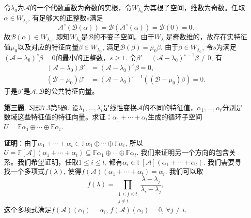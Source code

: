 {令$\lambda_0$为$\mathscr{A}$的一个代数重数为奇数的实根，令$W_{\lambda_0}$为其根子空间，维数为奇数。任取$\alpha \in W_{\lambda_0}$, 有足够大的正整数$s$满足
$$\mathscr{A}^s(\mathscr{B}(\alpha)) = \mathscr{B} (\mathscr{A}^s(\alpha)) = \mathscr{B}(0) = 0.$$
故$\mathscr{B}(\alpha) \in W_{\lambda_0}$, 即知$W_{\lambda_0}$是$\mathscr{B}$的不变子空间。由于$W_{\lambda_0}$是奇数维的，故存在实特征值$\mu_0$以及对应的特征向量$\beta \in W_{\lambda_0}$, 满足$\mathscr{B}(\beta) = \mu_0 \beta$. 由于$\beta \in W_{\lambda_0}$, 令$s$为满足
$(\mathscr{A} - \lambda_0)^s \beta = 0$的最小的正整数，$s \geqslant 1$. 令$\beta' = (\mathscr{A} - \lambda_0)^{s-1} \beta \neq 0$, 有
\begin{align*}
(\mathscr{A} - \lambda_0) \beta' & = (\mathscr{A} - \lambda_0)^s \beta = 0, \\
(\mathscr{B} - \mu_0) \beta' & = (\mathscr{A} - \lambda_0)^{s-1} ((\mathscr{B} - \mu_0) \beta) = 0.
\end{align*}
于是$\beta'$是$\mathscr{A,B}$的公共特征向量。







\newpageorvspace


{\bf 第三题}. 习题7.3第5题. 设$\lambda_1, \ldots, \lambda_t$是线性变换$\mathscr{A}$的不同的特征值，$\alpha_1, \ldots, \alpha_t$分别是数域这些特征值的特征向量。求证：$\alpha_1 + \cdots + \alpha_t$生成的循环子空间$U = \mathbb{F}\alpha_1 \oplus \cdots \oplus \mathbb{F}\alpha_t$.

\newpageorvspace

{\bf 证明}：由于$\alpha_1 + \cdots + \alpha_t \in \mathbb{F}\alpha_1 \oplus \cdots \oplus \mathbb{F}\alpha_t$, 所以$U = \mathbb{F}[\mathscr{A}](\alpha_1 + \cdots + \alpha_t) \subseteq \mathbb{F}\alpha_1 \oplus \cdots \oplus \mathbb{F}\alpha_t$. 我们来证明另一个方向的包含关系。我们希望证明，任取$1 \leqslant i \leqslant t$, 都有$\alpha_i \in \mathbb{F}[\mathscr{A}](\alpha_1 + \cdots + \alpha_t)$. 我们需要寻找一个多项式$f(\lambda)$, 使得$f(\mathscr{A}) (\alpha_1 + \cdots + \alpha_t) = \alpha_i$. 我们可以取
$$f(\lambda) = \prod\limits_{\substack{1 \leqslant j \leqslant t \\ j \neq i}} \dfrac{\lambda - \lambda_j}{\lambda_i - \lambda_j},$$
这个多项式满足$f(\mathscr{A})(\alpha_i) = \alpha_i$, $f(\mathscr{A})(\alpha_i) = 0$, $\forall j \neq i$. 


}
